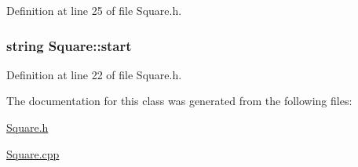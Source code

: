 Definition at line 25 of file Square.\-h.

\hypertarget{classSquare_ab8661c5b8e8026d074cf11c9e6634d18}{
\subsubsection[{start}]{\setlength{\rightskip}{0pt plus 5cm}string Square\-::start\hspace{0.3cm}{\ttfamily [protected]}}}\label{classSquare_ab8661c5b8e8026d074cf11c9e6634d18}


Definition at line 22 of file Square.\-h.



The documentation for this class was generated from the following files\-:\begin{DoxyCompactItemize}
\item 
\hyperlink{Square_8h}{Square.\-h}\item 
\hyperlink{Square_8cpp}{Square.\-cpp}\end{DoxyCompactItemize}
